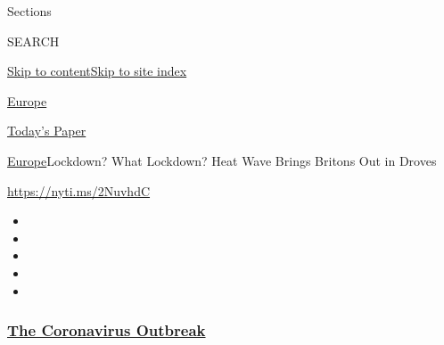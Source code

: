 Sections

SEARCH

\protect\hyperlink{site-content}{Skip to
content}\protect\hyperlink{site-index}{Skip to site index}

\href{https://www.nytimes3xbfgragh.onion/section/world/europe}{Europe}

\href{https://myaccount.nytimes3xbfgragh.onion/auth/login?response_type=cookie\&client_id=vi}{}

\href{https://www.nytimes3xbfgragh.onion/section/todayspaper}{Today's
Paper}

\href{/section/world/europe}{Europe}\textbar{}Lockdown? What Lockdown?
Heat Wave Brings Britons Out in Droves

\url{https://nyti.ms/2NuvhdC}

\begin{itemize}
\item
\item
\item
\item
\item
\end{itemize}

\hypertarget{the-coronavirus-outbreak}{%
\subsubsection{\texorpdfstring{\href{https://www.nytimes3xbfgragh.onion/news-event/coronavirus?name=styln-coronavirus-national\&region=TOP_BANNER\&variant=undefined\&block=storyline_menu_recirc\&action=click\&pgtype=Article\&impression_id=3f557140-e3a3-11ea-8263-afcaec2efa11}{The
Coronavirus
Outbreak}}{The Coronavirus Outbreak}}\label{the-coronavirus-outbreak}}

